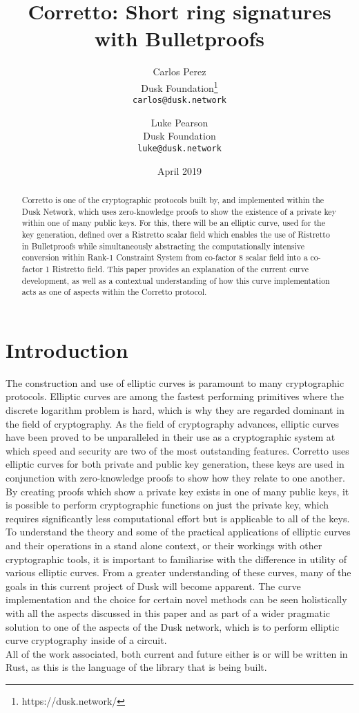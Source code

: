 \documentclass{article}
\title{Corretto: Short ring signatures with Bulletproofs}
\author{
  Carlos Perez\\
  Dusk Foundation\footnote{https://dusk.network/}\\
  \texttt{carlos@dusk.network}
  \and
  Luke Pearson\\
  Dusk Foundation\\
  \texttt{luke@dusk.network}
}
\date{April 2019}
\begin{document}
\maketitle
\thispagestyle{empty}
\pagestyle{empty}

\begin{abstract}
Corretto is one of the cryptographic protocols built by, and implemented within the Dusk Network, which uses zero-knowledge proofs to show the existence of a private key within one of many public keys. For this, there will be an elliptic curve, used for the key generation, defined over a Ristretto scalar field which enables the use of Ristretto in Bulletproofs while simultaneously abstracting the computationally intensive conversion within Rank-1 Constraint System from co-factor 8 scalar field into a co-factor 1 Ristretto field. This paper provides an explanation of the current curve development, as well as a contextual understanding of how this curve implementation acts as one of aspects within the Corretto protocol.


\end{abstract}

\newpage

\tableofcontents

\newpage

\section{Introduction}
The construction and use of elliptic curves is paramount to many cryptographic protocols. Elliptic curves are among the fastest performing primitives where the discrete logarithm problem is hard, which is why they are regarded dominant in the field of cryptography. As the field of cryptography advances, elliptic curves have been proved to be unparalleled in their use as a cryptographic system at which speed and security are two of the most outstanding features. Corretto uses elliptic curves for both private and public key generation, these keys are used in conjunction with zero-knowledge proofs to show how they relate to one another. By creating proofs which show a private key exists in one of many public keys, it is possible to perform cryptographic functions on just the private key, which requires significantly less computational effort but is applicable to all of the keys.  To understand the theory and some of the practical applications of elliptic curves and their operations in a stand alone context, or their workings with other cryptographic tools, it is important to familiarise with the difference in utility of various elliptic curves. From a greater understanding of these curves, many of the goals in this current project of Dusk will become apparent.  The curve implementation and the choice for certain novel methods can be seen holistically with all the aspects discussed in this paper and as part of a wider pragmatic solution to one of the aspects of the Dusk network, which is to perform elliptic curve cryptography inside of a circuit. \\
All of the work associated, both current and future either is or will be written in Rust, as this is the language of the library that is being built.
\end{document}
